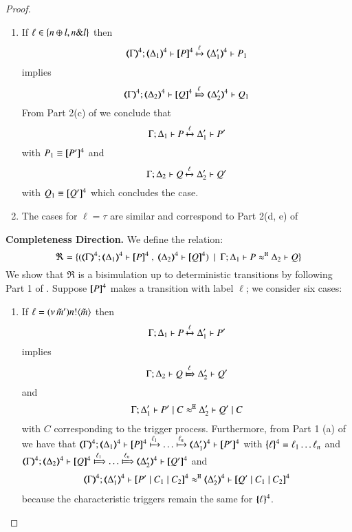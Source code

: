 \begin{proof}
\begin{enumerate}
		\item	If $\ell \in \{n \oplus l, n \& l\}$
				then
				\[
				\horel{\tmap{\Gamma}{4}}{\tmap{\Delta_1}{4}}{\pmap{P}{4}}{\hby{\ell}}{\tmap{\Delta_1'}{4}}{P_1}
				\]
				implies
				\[
				\horel{\tmap{\Gamma}{4}}{\tmap{\Delta_2}{4}}{\pmap{Q}{4}}{\Hby{\ell}}{\tmap{\Delta_2'}{4}}{Q_1}
				\]
				From Part 2(c) of  we conclude that
				\[	
				\Gamma; \Delta_1 \vdash P \xmapsto{\ell} \Delta_1' \vdash P'
				\]
				with $P_1 \equiv [\!\![P']\!\!]^4$
				and
				\[	
				\Gamma; \Delta_2 \vdash Q \xmapsto{\ell} \Delta_2' \vdash Q'
				\]
				with $Q_1 \equiv [\!\![Q']\!\!]^4$
				which concludes the case.

		\item	The cases for $\ell = \tau$ are similar
				and correspond to Part 2(d, e) of  
	\end{enumerate}
			
			

\bigskip

	\noi\textbf{Completeness Direction.} We define the relation: %
%
	\[
		\Re = \set{(\horel{\tmap{\Gamma}{4}}{\tmap{\Delta_1}{4}}{\pmap{P}{4}}{\ ,\ }{\tmap{\Delta_2}{4}}{\pmap{Q}{4}}) \setbar \horel{\Gamma}{\Delta_1}{P}{\hwb}{\Delta_2}{Q}}
	\]
%
	\noi	We show that $\Re$ is a bisimulation up to deterministic transitions by following Part 1 of .
	Suppose $[\!\![P]\!\!]^4$ makes a transition with label $\ell$; we consider six cases:
	\begin{enumerate}
		\item
		If $\ell = (\nu\, \tilde{m}') n ! \langle \tilde{m} \rangle$ then
		\[
		\Gamma; \Delta_1 \vdash P \xmapsto{\ell} \Delta_1' \vdash P'
		\]
		implies
		\[
		\horel{\Gamma}{\Delta_2}{Q}{\Hby{\ell}}{\Delta_2'}{Q'}
		\]
		and
		\[
		\Gamma; \Delta_1' \vdash P' \;|\; C \approx^\mathtt{H} \Delta_2' \vdash Q' \;|\; C
		\]
		with $C$ corresponding to the trigger process.
		Furthermore, from Part 1 (a) of  we have that
		$\horel{\tmap{\Gamma}{4}}{\tmap{\Delta_1}{4}}{\pmap{P}{4}}{\hby{\ell_1} \dots \hby{\ell_n}}{\tmap{\Delta_1'}{4}}{\pmap{P'}{4}}$
		with $\{\!\!\{\ell\}\!\!\}^{4} = \ell_1 \dots \ell_n$
		and
		$\horel{\tmap{\Gamma}{4}}{\tmap{\Delta_2}{4}}{\pmap{Q}{4}}{\Hby{\ell_1} \dots \Hby{\ell_n}}{\tmap{\Delta_2'}{4}}{\pmap{Q'}{4}}$
		and
		\begin{eqnarray*}
			\horel{\tmap{\Gamma}{4}}{\tmap{\Delta_1'}{4}}{\pmap{P' \Par C_1 \Par C_2}{4}}{\hwb}{\tmap{\Delta_2'}{4}}{\pmap{Q' \Par C_1 \Par C_2}{4}}
		\end{eqnarray*}
		because the characteristic triggers remain the same for $\{\!\!\{\ell\}\!\!\}^{4}$.
						

\end{enumerate}
\end{proof}
